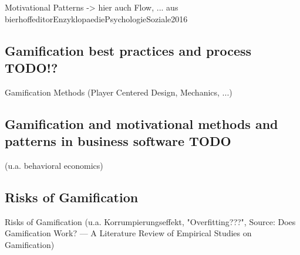 Motivational Patterns
-> hier auch Flow, ... aus bierhoffeditorEnzyklopaediePsychologieSoziale2016

\subsection{Gamification best practices and process TODO!?}
\label{sec:theoryBd}
Gamification Methods (Player Centered Design, Mechanics, ...)

\subsection{Gamification and motivational methods and patterns in business software TODO}
\label{sec:theoryBe}
(u.a. behavioral economics)

\subsection{Risks of Gamification}
\label{sec:theoryBf}
Risks of Gamification (u.a. Korrumpierungseffekt, "Overfitting???", Source: Does Gamification Work? — A Literature Review of Empirical Studies on
Gamification)


\newpage
